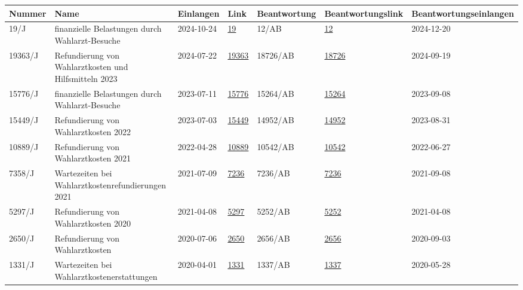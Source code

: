 \documentclass[landscape]{article}
\begin{document}
\small  %
\begin{longtable}{@{}p{1.5cm}p{4cm}p{2cm}p{2.5cm}p{1.5cm}p{2.5cm}p{2cm}@{}}
\toprule
Nummer & Name & Einlangen & Link & Beantwortung & Beantwortungslink & Beantwortungseinlangen \\
\midrule
\endhead
19/J & finanzielle Belastungen durch Wahlarzt-Besuche & 2024-10-24 & \href{https://www.parlament.gv.at/gegenstand/XXVIII/J/19}{19} & 12/AB & \href{https://www.parlament.gv.at/gegenstand/XXVIII/AB/12}{12} & 2024-12-20 \\
19363/J & Refundierung von Wahlarztkosten und Hilfsmitteln 2023 & 2024-07-22 & \href{https://www.parlament.gv.at/gegenstand/XXVII/J/19363}{19363} & 18726/AB & \href{https://www.parlament.gv.at/gegenstand/XXVII/AB/18726}{18726} & 2024-09-19 \\
15776/J & finanzielle Belastungen durch Wahlarzt-Besuche & 2023-07-11 & \href{https://www.parlament.gv.at/gegenstand/XXVII/J/15776}{15776} & 15264/AB & \href{https://www.parlament.gv.at/gegenstand/XXVII/AB/15264}{15264} & 2023-09-08 \\
15449/J & Refundierung von Wahlarztkosten 2022 & 2023-07-03 & \href{https://www.parlament.gv.at/gegenstand/XXVII/J/15449}{15449} & 14952/AB & \href{https://www.parlament.gv.at/gegenstand/XXVII/AB/14952}{14952} & 2023-08-31 \\
10889/J & Refundierung von Wahlarztkosten 2021 & 2022-04-28 & \href{https://www.parlament.gv.at/gegenstand/XXVII/J/10889}{10889} & 10542/AB & \href{https://www.parlament.gv.at/gegenstand/XXVII/AB/10542}{10542} & 2022-06-27 \\
7358/J & Wartezeiten bei Wahlarztkostenrefundierungen 2021 & 2021-07-09 & \href{https://www.parlament.gv.at/gegenstand/XXVII/AB/7236}{7236} & 7236/AB & \href{https://www.parlament.gv.at/gegenstand/XXVII/AB/7236}{7236} & 2021-09-08 \\
5297/J & Refundierung von Wahlarztkosten 2020 & 2021-04-08 & \href{https://www.parlament.gv.at/gegenstand/XXVII/J/5297}{5297} & 5252/AB & \href{https://www.parlament.gv.at/gegenstand/XXVII/AB/5252}{5252} & 2021-04-08 \\
2650/J & Refundierung von Wahlarztkosten & 2020-07-06 & \href{https://www.parlament.gv.at/gegenstand/XXVII/J/2650}{2650} & 2656/AB & \href{https://www.parlament.gv.at/gegenstand/XXVII/AB/2656}{2656} & 2020-09-03 \\
1331/J & Wartezeiten bei Wahlarztkostenerstattungen & 2020-04-01 & \href{https://www.parlament.gv.at/gegenstand/XXVII/J/1331}{1331} & 1337/AB & \href{https://www.parlament.gv.at/gegenstand/XXVII/AB/1337}{1337} & 2020-05-28 \\

\end{longtable}
\end{document}
